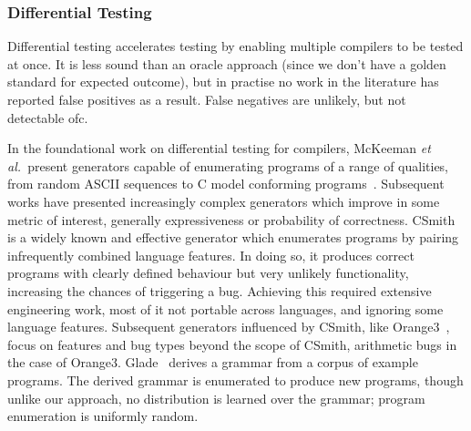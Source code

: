 


\subsubsection{Differential Testing}

Differential testing accelerates testing by enabling multiple compilers to be tested at once. It is less sound than an oracle approach (since we don't have a golden standard for expected outcome), but in practise no work in the literature has reported false positives as a result. False negatives are unlikely, but not detectable ofc.

In the foundational work on differential testing for compilers, McKeeman \emph{et al.\ }present generators capable of enumerating programs of a range of qualities, from random ASCII sequences to C model conforming programs~\cite{McKeeman1998}. Subsequent works have presented increasingly complex generators which improve in some metric of interest, generally expressiveness or probability of correctness. CSmith~\cite{Yang2011} is a widely known and effective generator which enumerates programs by pairing infrequently combined language features. In doing so, it produces correct programs with clearly defined behaviour but very unlikely functionality, increasing the chances of triggering a bug. Achieving this required extensive engineering work, most of it not portable across languages, and ignoring some language features. Subsequent generators influenced by CSmith, like Orange3~\cite{Nagai2013}, focus on features and bug types beyond the scope of CSmith, arithmetic bugs in the case of Orange3. Glade~\cite{Bastani2017} derives a grammar from a corpus of example programs. The derived grammar is enumerated to produce new programs, though unlike our approach, no distribution is learned over the grammar; program enumeration is uniformly random.

